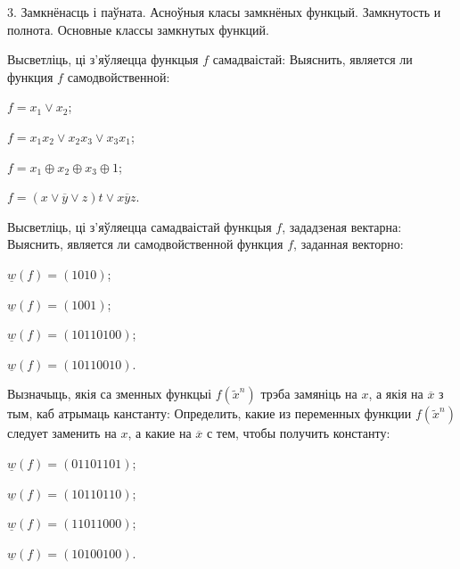 \documentclass[12pt, a4paper]{article}
\begin{document}
\biLangHeader
{3. Замкнёнасць і паўната. Асноўныя класы замкнёных функцый.}
{Замкнутость и полнота. Основные классы замкнутых функций.}

\begin{problemList}

\problemItemWithCommonPart
{Высветліць, ці з'яўляецца функцыя $f$ самадваістай:}
{Выяснить, является ли функция $f$ самодвойственной:}
{%
\begin{belarusianEnumerateMulticol}
    \item $f=x_1\vee x_2$;
    \item $f=x_1x_2\vee x_2x_3\vee x_3x_1$;
    \item $f=x_1\oplus x_2\oplus x_3\oplus 1$;
    \item $f=(x\vee \overline{y}\vee z)t\vee x\overline{y}z$.
\end{belarusianEnumerateMulticol} 
}

\smallskip

\problemItemWithCommonPart
{Высветліць, ці з'яўляецца самадваістай функцыя $f$, зададзеная вектарна:}
{Выяснить, является ли самодвойственной функция $f$, заданная векторно:}
{%
\begin{belarusianEnumerateMulticol}
    \item $\underline{w}(f)=(1010)$;
    \item $\underline{w}(f)=(1001)$;
    \item $\underline{w}(f)=(10110100)$;
    \item $\underline{w}(f)=(10110010)$.
\end{belarusianEnumerateMulticol}
}

\smallskip

\problemItemWithCommonPart
{Вызначыць, якія са зменных функцыі $f(\tilde x^n)$ трэба замяніць на $x$,
а якія на $\overline{x}$ з тым, каб атрымаць канстанту:}
{Определить, какие из переменных функции $f(\tilde x^n)$ следует заменить на $x$,
а какие на $\overline{x}$ с тем, чтобы получить константу:}
{%
\begin{belarusianEnumerateMulticol}
    \item $\underline{w}(f)=(01101101)$;
    \item $\underline{w}(f)=(10110110)$;
    \item $\underline{w}(f)=(11011000)$;
    \item $\underline{w}(f)=(10100100)$.
\end{belarusianEnumerateMulticol}
}

\smallskip


\end{problemList}
\end{document}
